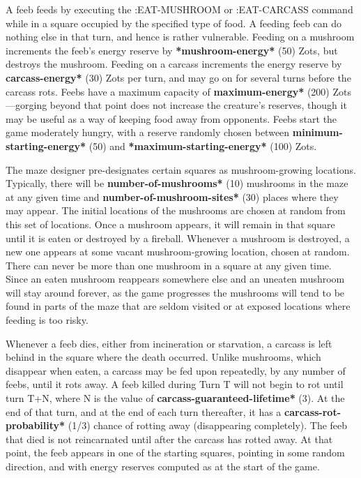 \documentclass[12pt]{article}
\begin{document}
A feeb feeds by executing the :EAT-MUSHROOM or :EAT-CARCASS command
while in a square occupied by the specified type of food.  A feeding
feeb can do nothing else in that turn, and hence is rather vulnerable.
Feeding on a mushroom increments the feeb's energy reserve by {\bf
*mushroom-energy*} (50) Zots, but destroys the mushroom.  Feeding on a
carcass increments the energy reserve by {\bf *carcass-energy*} (30)
Zots per turn, and may go on for several turns before the carcass
rots.  Feebs have a maximum capacity of {\bf *maximum-energy*} (200)
Zots---gorging beyond that point does not increase the creature's
reserves, though it may be useful as a way of keeping food away from
opponents.  Feebs start the game moderately hungry, with a reserve
randomly chosen between {\bf *minimum-starting-energy*} (50) and {\bf
*maximum-starting-energy*} (100) Zots.

The maze designer pre-designates certain squares as mushroom-growing
locations.  Typically, there will be {\bf *number-of-mushrooms*} (10)
mushrooms in the maze at any given time and
{\bf *number-of-mushroom-sites*} (30) places where they may appear.  The
initial locations of the mushrooms are chosen at random from this set of
locations.  Once a mushroom appears, it will remain in that square until
it is eaten or destroyed by a fireball.  Whenever a mushroom is
destroyed, a new one appears at some vacant mushroom-growing location,
chosen at random.  There can never be more than one mushroom in a square
at any given time.  Since an eaten mushroom reappears somewhere else and
an uneaten mushroom will stay around forever, as the game progresses the
mushrooms will tend to be found in parts of the maze that are seldom
visited or at exposed locations where feeding is too risky.

Whenever a feeb dies, either from incineration or starvation, a carcass
is left behind in the square where the death occurred.  Unlike
mushrooms, which disappear when eaten, a carcass may be fed upon
repeatedly, by any number of feebs, until it rots away.  A feeb killed
during Turn T will not begin to rot until turn T+N, where N is the value
of {\bf *carcass-guaranteed-lifetime*} (3).  At the end of that turn, and
at the end of each turn thereafter, it has a
{\bf *carcass-rot-probability*} (1/3) chance of rotting away (disappearing
completely).  The feeb that died is not reincarnated until after the
carcass has rotted away.  At that point, the feeb appears in one of the
starting squares, pointing in some random direction, and with energy
reserves computed as at the start of the game.
\end{document}
